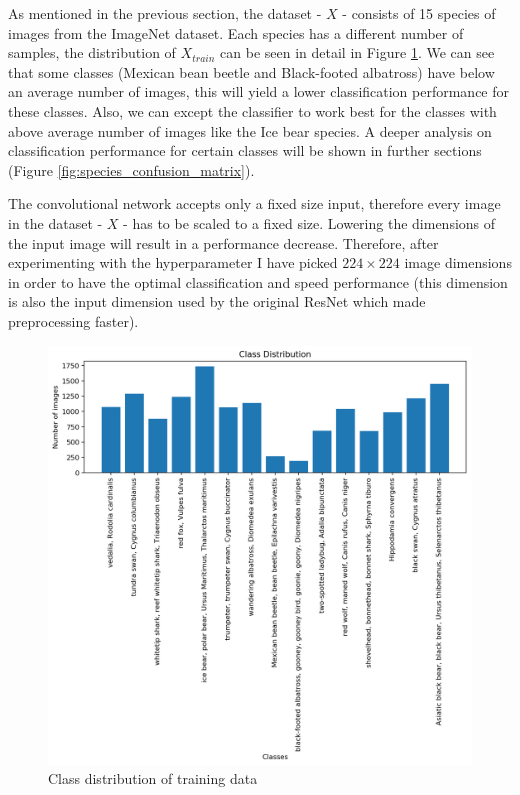 \documentclass[times, utf8, diplomski]{fer}
\begin{document}
As mentioned in the previous section, the dataset - $X$ - consists of 15 species of images from the ImageNet dataset. Each species has a different number of samples, the distribution of $X_{train}$ can be seen in detail in Figure \ref{fig:training_set_class_distributon}. We can see that some classes (Mexican bean beetle and Black-footed albatross) have below an average number of images, this will yield a lower classification performance for these classes. Also, we can except the classifier to work best for the classes with above average number of images like the Ice bear species. A deeper analysis on classification performance for certain classes will be shown in further sections (Figure \ref{fig:species_confusion_matrix}).

The convolutional network accepts only a fixed size input, therefore every image in the dataset - $X$ - has to be scaled to a fixed size. Lowering the dimensions of the input image will result in a performance decrease. Therefore, after experimenting with the hyperparameter I have picked $224 \times 224$ image dimensions in order to have the optimal classification and speed performance (this dimension is also the input dimension used by the original ResNet which made preprocessing faster).

\begin{figure}
  \includegraphics[scale=0.75]{figures/class_distribution.png}
  \centering
  \caption{Class distribution of training data}
  \label{fig:training_set_class_distributon}
\end{figure}
\end{document}
